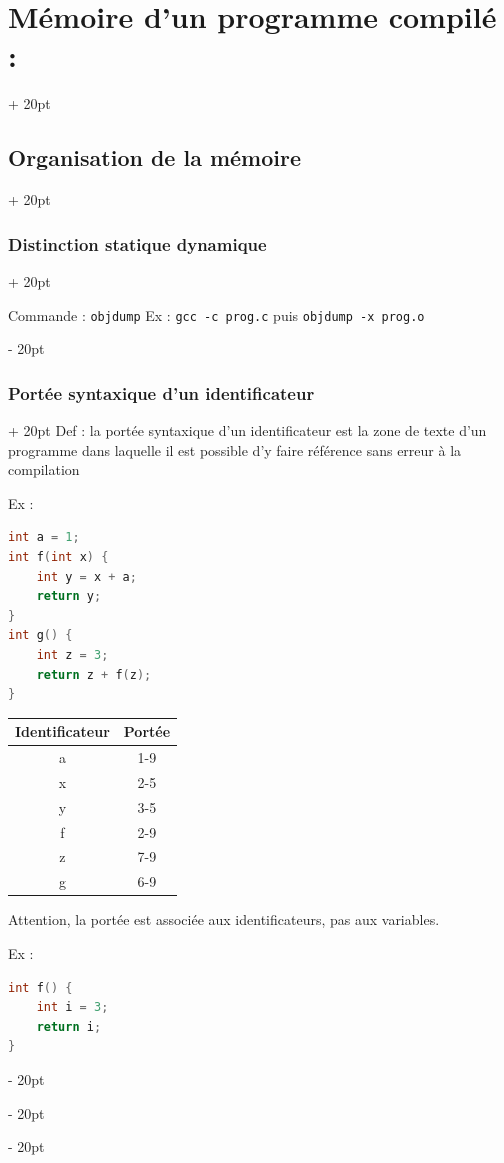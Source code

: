 \documentclass[a4paper, 12pt, twoside]{article}
\newcommand{\ind}[1][20pt]{\advance\leftskip + #1}
\newcommand{\deind}[1][20pt]{\advance\leftskip - #1}
\newenvironment{indentedenv}[1][20pt]{\par \ind[#1]}{\par \deind}
\newenvironment{indt}[2][20pt]{#2 \begin{indentedenv}[#1]}{\end{indentedenv}} %
\begin{document}
\begin{indt}{\section{Mémoire d'un programme compilé :}}
\begin{indt}{\subsection{Organisation de la mémoire}}
\begin{indt}{\subsubsection{Distinction statique dynamique}}
                \vspace{12pt}
                
                Commande : \texttt{objdump}
                Ex : \texttt{gcc -c prog.c}
                puis
                \texttt{objdump -x prog.o}
                
            \end{indt}
        
            
            \begin{indt}{\subsubsection{Portée syntaxique d'un identificateur}}
                Def : la portée syntaxique d'un identificateur est la zone de texte d'un programme dans laquelle il est possible d'y faire référence sans erreur à la compilation
                
                Ex :
                \begin{lstlisting}[language=C, xleftmargin=80pt]
int a = 1;
int f(int x) {
    int y = x + a;
    return y;
}
int g() {
    int z = 3;
    return z + f(z);
}
                \end{lstlisting}
                
                \begin{tabular}{c|c}
                    Identificateur
                    & Portée
                    \\
                    \hline
                    a & 1-9
                    \\
                    x & 2-5
                    \\
                    y & 3-5
                    \\
                    f & 2-9
                    \\
                    z & 7-9
                    \\
                    g & 6-9
                \end{tabular}
                
                Attention, la portée est associée aux identificateurs, pas aux variables.
                
                Ex :
                \begin{lstlisting}[language=C, xleftmargin=80pt]
int f() {
    int i = 3;
    return i;
}


\end{lstlisting}
\end{indt}
\end{indt}
\end{indt}
\end{document}
